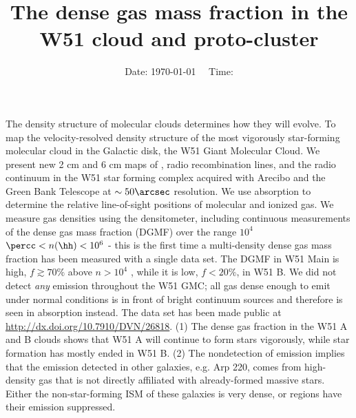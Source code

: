 



\title{The dense gas mass fraction in the W51 cloud and proto-cluster}



\date{Date: \today ~~ Time: \currenttime}

%

\abstract
{The density structure of molecular clouds determines how they will evolve.}
{To map the velocity-resolved density structure of the most vigorously
star-forming molecular cloud in the Galactic disk, the W51 Giant Molecular
Cloud.}
{
We present new 2 cm and 6 cm maps of \formaldehyde, radio recombination lines,
and the radio continuum in the W51 star forming complex acquired with Arecibo
and the Green Bank Telescope at $\sim50\arcsec$ resolution.
We use \formaldehyde absorption to determine the relative line-of-sight
positions of molecular and ionized gas.  We measure gas densities using the
\formaldehyde densitometer, including continuous measurements of the dense gas
mass
fraction (DGMF) over the range $10^4$ $\percc< n(\hh) < 10^6$ \percc - this is
the first time a multi-density dense gas mass fraction has been measured with a
single data set.}
{The DGMF in W51 Main is high, $f\gtrsim70\%$ above $n>10^4$
\percc, while it is low, $f<20\%$, in W51 B.
We did not detect \emph{any} \formaldehyde emission throughout the W51 GMC; all
gas dense enough to emit under normal conditions is in front of bright
continuum sources and therefore is seen in absorption instead.  
The data set has been made public at \protect\url{http://dx.doi.org/10.7910/DVN/26818}.
}
{(1) The dense gas fraction in the W51 A and B clouds shows that W51 A will
continue to form stars vigorously, while star formation has mostly ended in W51
B.
(2) The nondetection of \formaldehyde emission implies that the  emission
detected in other galaxies, e.g. Arp 220, comes from high-density gas that is
not directly affiliated with already-formed massive stars.  Either the
non-star-forming ISM of these galaxies is very dense, or \hii regions have
their emission suppressed.
}


